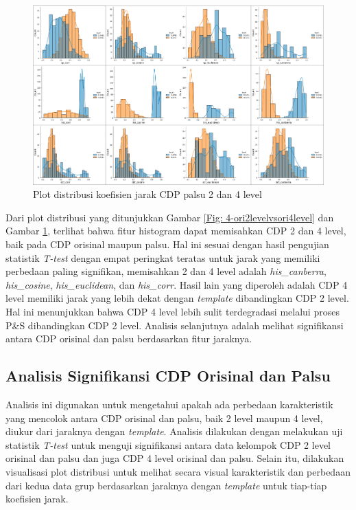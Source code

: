 \begin{figure}[!h]
	\centering
	\includegraphics[width=\textwidth]{contents/chapter-4/4-fake2levelvsfake4level.png}
	\caption{Plot distribusi koefisien jarak CDP palsu 2 dan 4 level}
	\label{Fig: 4-fake2levelvsfake4level}
\end{figure}

Dari plot distribusi yang ditunjukkan Gambar \ref{Fig: 4-ori2levelvsori4level} dan Gambar \ref{Fig: 4-fake2levelvsfake4level}, terlihat bahwa fitur histogram
dapat memisahkan CDP 2 dan 4 level, baik pada CDP orisinal maupun palsu. Hal ini sesuai dengan hasil pengujian statistik \emph{T-test} dengan empat peringkat
teratas untuk jarak yang memiliki perbedaan paling signifikan, memisahkan 2 dan 4 level adalah \emph{his\_canberra}, \emph{his\_cosine}, \emph{his\_euclidean},
dan \emph{his\_corr}. Hasil lain yang diperoleh adalah CDP 4 level memiliki jarak yang lebih dekat dengan \emph{template} dibandingkan CDP 2 level. Hal ini
menunjukkan bahwa CDP 4 level lebih sulit terdegradasi melalui proses P\&S dibandingkan CDP 2 level. Analisis selanjutnya adalah melihat signifikansi antara
CDP orisinal dan palsu berdasarkan fitur jaraknya.

\subsection{Analisis Signifikansi CDP Orisinal dan Palsu}
Analisis ini digunakan untuk mengetahui apakah ada perbedaan karakteristik yang mencolok antara CDP orisinal dan palsu, baik 2 level maupun 4 level, diukur
dari jaraknya dengan \emph{template}. Analisis dilakukan dengan melakukan uji statistik \emph{T-test} untuk menguji signifikansi antara data kelompok CDP 2
level orisinal dan palsu dan juga CDP 4 level orisinal dan palsu. Selain itu, dilakukan visualisasi plot distribusi untuk melihat secara visual karakteristik
dan perbedaan dari kedua data grup berdasarkan jaraknya dengan \emph{template} untuk tiap-tiap koefisien jarak.

